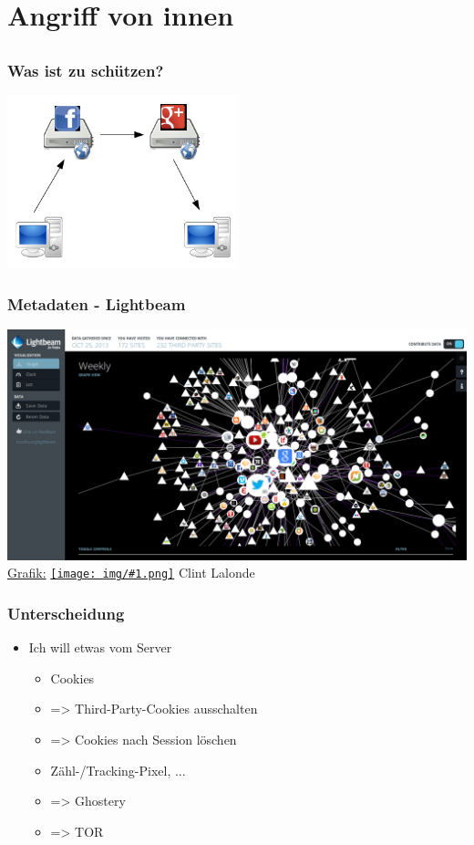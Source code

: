 \documentclass[12pt]{beamer}
\newcommand{\cc}[1]{\texttt{[image: img/\#1.png]}\hspace{1mm}}
\begin{document}
\section{Angriff von innen}
\subsection{}

\begin{frame}
    \frametitle{Was ist zu schützen?}
    \begin{center}
      \includegraphics[height=5cm]{img/fed-social.png}
    \end{center}
\end{frame}

\begin{frame}
    \frametitle{Metadaten - Lightbeam}
    \includegraphics[height=0.7\textheight]{img/lightbeam.png}
  \\{\small \href{http://www.flickr.com/photos/8517757@N03/10538205035/in/photolist-h4e4dg}{Grafik:} \href{http://creativecommons.org/licenses/by-sa/3.0/deed.en}{\cc{by-sa}} Clint Lalonde}
\end{frame}

\begin{frame}
    \frametitle{Unterscheidung}
    \begin{itemize}
      \item<2-> Ich will etwas vom Server
        \begin{itemize}
          \item<3-> Cookies
          \item<4-> => Third-Party-Cookies ausschalten
          \item<5-> => Cookies nach Session löschen
          \item<6-> Zähl-/Tracking-Pixel, ...
          \item<7-> => Ghostery
          \item<8-> => TOR
        \end{itemize}
    \end{itemize}
\end{frame}
\end{document}
